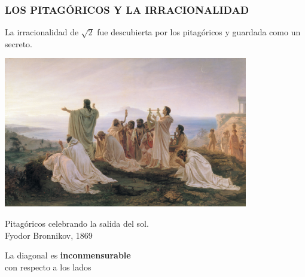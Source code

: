 \begin{frame}
  \frametitle{LOS PITAGÓRICOS Y LA IRRACIONALIDAD}

  La irracionalidad de $\sqrt{2}$ fue descubierta por los pitagóricos y guardada
  como un secreto.

  \begin{center}
    \includegraphics[width=0.8\textwidth]{pic/pitagoricos.jpg}

    Pitagóricos celebrando la salida del sol. \\
    Fyodor Bronnikov, 1869
  \end{center}
\end{frame}

\begin{frame}
  \begin{center}

    \vspace{1em}

    La diagonal es \textbf{inconmensurable}\\
    con respecto a los lados
  \end{center}
\end{frame}

